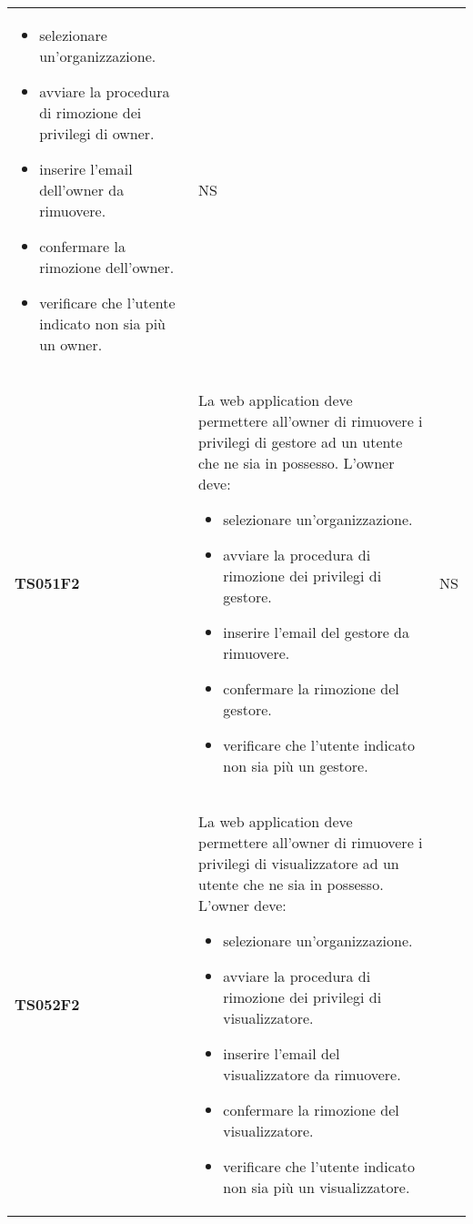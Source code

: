 \documentclass[../piano-di-qualifica.tex]{subfiles}
\begin{document}
\begin{centering}
\begin{longtable}[H]{>{\centering\bfseries}m{3cm} >{}p{10cm} >{\centering\arraybackslash}m{3cm}}
\begin{itemize}
                        \item selezionare un'organizzazione.
                        \item avviare la procedura di rimozione dei privilegi di owner.
                        \item inserire l'email dell'owner da rimuovere.
                        \item confermare la rimozione dell'owner.
                        \item verificare che l'utente indicato non sia più un owner.
                      \end{itemize}
                    & NS \\
        TS051F2     & La web application deve permettere all'owner di rimuovere i privilegi di gestore ad un utente che ne sia in possesso. \newline
                      L'owner deve:
                      \begin{itemize}
                        \item selezionare un'organizzazione.
                        \item avviare la procedura di rimozione dei privilegi di gestore.
                        \item inserire l'email del gestore da rimuovere.
                        \item confermare la rimozione del gestore.
                        \item verificare che l'utente indicato non sia più un gestore.
                      \end{itemize}
                    & NS \\
        TS052F2     & La web application deve permettere all'owner di rimuovere i privilegi di visualizzatore ad un utente che ne sia in possesso. \newline
                      L'owner deve:
                      \begin{itemize}
                        \item selezionare un'organizzazione.
                        \item avviare la procedura di rimozione dei privilegi di visualizzatore.
                        \item inserire l'email del visualizzatore da rimuovere.
                        \item confermare la rimozione del visualizzatore.
                        \item verificare che l'utente indicato non sia più un visualizzatore.

\end{itemize}
\end{longtable}
\end{centering}
\end{document}
